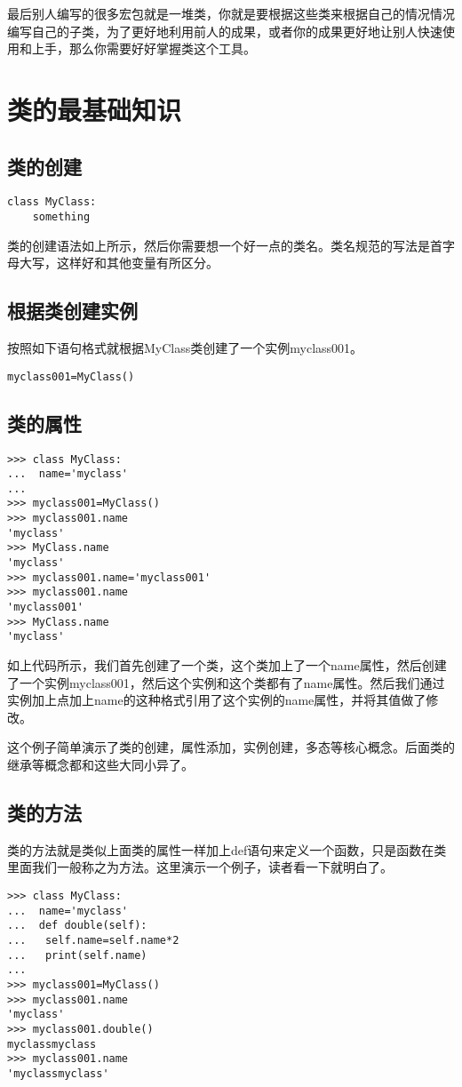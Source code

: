 \documentclass[12pt,oneside]{book}
\begin{document}
\begin{common-format}
最后别人编写的很多宏包就是一堆类，你就是要根据这些类来根据自己的情况情况编写自己的子类，为了更好地利用前人的成果，或者你的成果更好地让别人快速使用和上手，那么你需要好好掌握类这个工具。

\section{类的最基础知识}
\subsection{类的创建}
\begin{Verbatim}
class MyClass:
    something
\end{Verbatim}
类的创建语法如上所示，然后你需要想一个好一点的类名。类名规范的写法是首字母大写，这样好和其他变量有所区分。

\subsection{根据类创建实例}
按照如下语句格式就根据MyClass类创建了一个实例myclass001。
\begin{Verbatim}
myclass001=MyClass()
\end{Verbatim}

\subsection{类的属性}
\begin{Verbatim}
>>> class MyClass:
...  name='myclass'
... 
>>> myclass001=MyClass()
>>> myclass001.name
'myclass'
>>> MyClass.name
'myclass'
>>> myclass001.name='myclass001'
>>> myclass001.name
'myclass001'
>>> MyClass.name
'myclass'
\end{Verbatim}
如上代码所示，我们首先创建了一个类，这个类加上了一个name属性，然后创建了一个实例myclass001，然后这个实例和这个类都有了name属性。然后我们通过实例加上点加上name的这种格式引用了这个实例的name属性，并将其值做了修改。

这个例子简单演示了类的创建，属性添加，实例创建，多态等核心概念。后面类的继承等概念都和这些大同小异了。


\subsection{类的方法}
类的方法就是类似上面类的属性一样加上def语句来定义一个函数，只是函数在类里面我们一般称之为方法。这里演示一个例子，读者看一下就明白了。
\begin{Verbatim}
>>> class MyClass:
...  name='myclass'
...  def double(self):
...   self.name=self.name*2
...   print(self.name)
... 
>>> myclass001=MyClass()
>>> myclass001.name
'myclass'
>>> myclass001.double()
myclassmyclass
>>> myclass001.name
'myclassmyclass'
\end{Verbatim}


\end{common-format}
\end{document}
